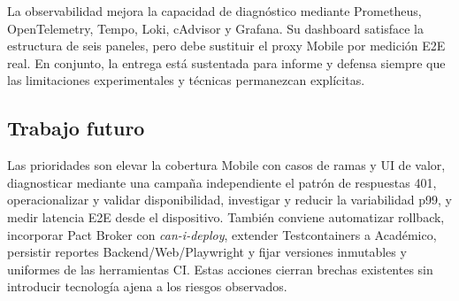 La observabilidad mejora la capacidad de diagnóstico mediante Prometheus,
OpenTelemetry, Tempo, Loki, cAdvisor y Grafana. Su dashboard satisface la
estructura de seis paneles, pero debe sustituir el proxy Mobile por medición E2E
real. En conjunto, la entrega está sustentada para informe y defensa siempre que
las limitaciones experimentales y técnicas permanezcan explícitas.

\subsection{Trabajo futuro}
\label{subsec:trabajo-futuro}

Las prioridades son elevar la cobertura Mobile con casos de ramas y UI de valor,
diagnosticar mediante una campaña independiente el patrón de respuestas 401,
operacionalizar y validar disponibilidad, investigar y reducir la variabilidad
p99, y medir latencia E2E
desde el dispositivo. También conviene automatizar rollback, incorporar Pact
Broker con \emph{can-i-deploy}, extender Testcontainers a Académico, persistir
reportes Backend/Web/Playwright y fijar versiones inmutables y uniformes de las
herramientas CI. Estas acciones cierran brechas existentes sin introducir
tecnología ajena a los riesgos observados.
